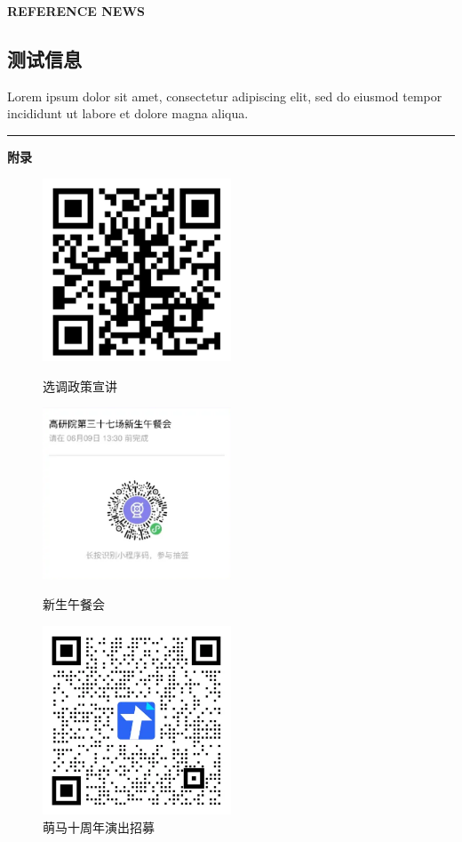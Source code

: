 \documentclass[letterpaper, 12pt]{article}
\begin{document}
\vspace{4mm}
\centerline{\huge\textbf{REFERENCE NEWS}}
\begin{multicols}{2}
\section{测试信息}
Lorem ipsum dolor sit amet, consectetur adipiscing elit, sed do eiusmod tempor incididunt ut labore et dolore magna aliqua.
\end{multicols} 
\hrule
\vspace{4mm}
\centerline{\huge\textbf{附录}}
\begin{figure}[htbp]
    \centering
    \begin{minipage}[b]{0.32\textwidth}
        \centering
        \includegraphics[width=0.5\textwidth]{选调政策宣讲.png}
        \caption{选调政策宣讲}
    \end{minipage}
    \begin{minipage}[b]{0.32\textwidth}
        \centering
        \includegraphics[width=0.5\textwidth]{新生午餐会.png}
        \caption{新生午餐会}
    \end{minipage}
    \begin{minipage}[b]{0.32\textwidth}
        \centering
        \includegraphics[width=0.5\textwidth]{萌马十周年演出招募.png}
        \caption{萌马十周年演出招募}
    \end{minipage}
\end{figure}
\end{document}
